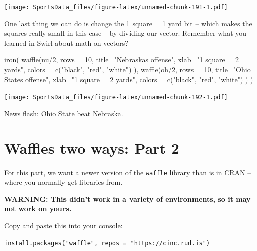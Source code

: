 \documentclass[
]{book}
\newenvironment{Shaded}{\begin{snugshade}}{\end{snugshade}}
\newcommand{\AttributeTok}[1]{\textcolor[rgb]{0.77,0.63,0.00}{#1}}
\newcommand{\DecValTok}[1]{\textcolor[rgb]{0.00,0.00,0.81}{#1}}
\newcommand{\FunctionTok}[1]{\textcolor[rgb]{0.00,0.00,0.00}{#1}}
\newcommand{\NormalTok}[1]{#1}
\newcommand{\SpecialCharTok}[1]{\textcolor[rgb]{0.00,0.00,0.00}{#1}}
\newcommand{\StringTok}[1]{\textcolor[rgb]{0.31,0.60,0.02}{#1}}
\begin{document}
\texttt{[image: SportsData\_files/figure-latex/unnamed-chunk-191-1.pdf]}

One last thing we can do is change the 1 square = 1 yard bit -- which makes the squares really small in this case -- by dividing our vector. Remember what you learned in Swirl about math on vectors?

\begin{Shaded}
\begin{Highlighting}[]
\FunctionTok{iron}\NormalTok{(}
 \FunctionTok{waffle}\NormalTok{(nu}\SpecialCharTok{/}\DecValTok{2}\NormalTok{, }
        \AttributeTok{rows =} \DecValTok{10}\NormalTok{, }
        \AttributeTok{title=}\StringTok{"Nebraska\textquotesingle{}s offense"}\NormalTok{, }
        \AttributeTok{xlab=}\StringTok{"1 square = 2 yards"}\NormalTok{, }
        \AttributeTok{colors =} \FunctionTok{c}\NormalTok{(}\StringTok{"black"}\NormalTok{, }\StringTok{"red"}\NormalTok{, }\StringTok{"white"}\NormalTok{)}
\NormalTok{        ),}
 \FunctionTok{waffle}\NormalTok{(oh}\SpecialCharTok{/}\DecValTok{2}\NormalTok{, }
        \AttributeTok{rows =} \DecValTok{10}\NormalTok{, }
        \AttributeTok{title=}\StringTok{"Ohio State\textquotesingle{}s offense"}\NormalTok{, }
        \AttributeTok{xlab=}\StringTok{"1 square = 2 yards"}\NormalTok{, }
        \AttributeTok{colors =} \FunctionTok{c}\NormalTok{(}\StringTok{"black"}\NormalTok{, }\StringTok{"red"}\NormalTok{, }\StringTok{"white"}\NormalTok{)}
\NormalTok{        )}
\NormalTok{)}
\end{Highlighting}
\end{Shaded}

\texttt{[image: SportsData\_files/figure-latex/unnamed-chunk-192-1.pdf]}

News flash: Ohio State beat Nebraska.

\hypertarget{waffles-two-ways-part-2}{%
\section{Waffles two ways: Part 2}\label{waffles-two-ways-part-2}}

For this part, we want a newer version of the \texttt{waffle} library than is in CRAN -- where you normally get libraries from.

\textbf{WARNING: This didn't work in a variety of environments, so it may not work on yours.}

Copy and paste this into your console:

\texttt{install.packages("waffle",\ repos\ =\ "https://cinc.rud.is")}
\end{document}
